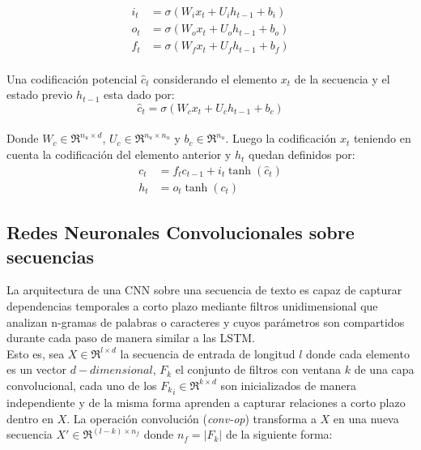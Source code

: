 	\begin{equation}
		\begin{split}
		i_{t} &= \sigma(W_i x_t + U_i  h_{t-1} + b_i)\\
		o_{t} &= \sigma(W_o x_t + U_o h_{t-1} + b_o)\\
		f_t &= \sigma(W_{f} x_t + U_f   h_{t-1} + b_f) 
		\end{split}
		\label{lstm_gates}
	\end{equation}
	\\
	Una codificación potencial $\hat{c}_t$ considerando el elemento $x_t$ de la secuencia y el estado previo $h_{t-1}$ esta dado por:
	\begin{equation}
		\hat{c}_{t} = \sigma(W_cx_t + U_c h_{t-1} + b_c)
		\label{lstm_pu}
	\end{equation}
	\\
	Donde $W_c\in\Re^{n_u\times d}$, $U_c\in\Re^{n_u\times n_u}$ y  $b_c\in\Re^{n_u}$. Luego la codificación $x_t$ teniendo en cuenta la codificación del elemento anterior y $h_t$ quedan definidos por:
	 \begin{equation}
	 	\begin{split}
	 		c_{t} &= f_tc_{t-1} +i_t\tanh(\hat{c}_{t})\\
	 		h_t &= o_t\tanh(c_t)
	 	\end{split}
	 	\label{lstm_hstate}
	 \end{equation}
 
 
\subsection{Redes Neuronales Convolucionales sobre secuencias}
	
	La arquitectura de una CNN \citep{lecun1998gradient} sobre una secuencia de texto es capaz de capturar dependencias temporales a corto plazo mediante filtros unidimensional que analizan n-gramas de palabras o caracteres y cuyos parámetros son compartidos durante cada paso de manera similar a las LSTM.
	\\
	Esto es, sea $X \in \Re^{l\times d}$ la secuencia de entrada de longitud $l$ donde cada elemento es un vector $d-dimensional$, $F_k$ el conjunto de filtros con ventana $k$ de una capa convolucional, cada uno de los ${F_k}_i \in \Re^{k\times d}$ son inicializados de manera independiente y de la misma forma aprenden a capturar relaciones a corto plazo  dentro en $X$. La operación convolución (\textit{conv-op}) transforma a $X$ en una nueva secuencia $X' \in \Re^{(l - k) \times n_f}$ donde $n_f = |F_k|$ de la siguiente forma:
	
